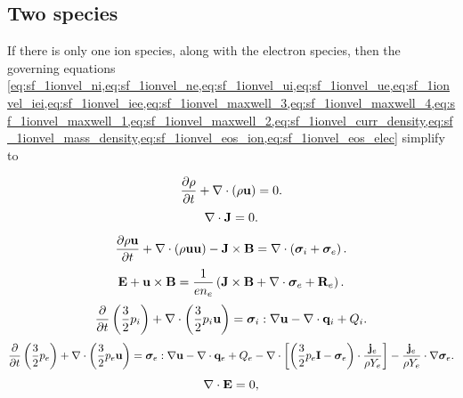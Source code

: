 \documentclass[a4paper,11pt]{report}
\begin{document}
\subsection{Two species}
If there is only one ion species, along with the electron species, then the governing equations \cref{eq:sf_1ionvel_ni,eq:sf_1ionvel_ne,eq:sf_1ionvel_ui,eq:sf_1ionvel_ue,eq:sf_1ionvel_iei,eq:sf_1ionvel_iee,eq:sf_1ionvel_maxwell_3,eq:sf_1ionvel_maxwell_4,eq:sf_1ionvel_maxwell_1,eq:sf_1ionvel_maxwell_2,eq:sf_1ionvel_curr_density,eq:sf_1ionvel_mass_density,eq:sf_1ionvel_eos_ion,eq:sf_1ionvel_eos_elec} simplify to

\begin{equation}
    \label{eq:sf_1ion_ni}
    \frac{\partial \rho}{\partial t} + \nabla \cdot \left( \rho \mathbf{u} \right) = 0.
\end{equation}
\begin{equation}
    \label{eq:sf_1ion_ne}
    \nabla \cdot \mathbf{J} = 0.
\end{equation}
\begin{equation}
    \label{eq:sf_1ion_ui}
    \frac{\partial \rho \mathbf{u}}{\partial t} + \nabla \cdot \left( \rho \mathbf{u} \mathbf{u} \right) - \mathbf{J} \times \mathbf{B} = \nabla \cdot \left( \bm \sigma_i + \bm \sigma_e \right).
\end{equation}
\begin{equation}
    \label{eq:sf_1ion_ue}
    \mathbf{E} + \mathbf{u} \times \mathbf{B} = \frac{1}{e n_e} \left( \mathbf{J} \times \mathbf{B} + \nabla \cdot \bm \sigma_e + \mathbf{R}_e \right) .
\end{equation}
\begin{equation}
    \label{eq:sf_1ion_iei}
    \frac{\partial}{\partial t} \left( \frac{3}{2} p_i \right) + \nabla \cdot \left( \frac{3}{2} p_i \mathbf{u} \right) = \bm \sigma_i : \nabla \mathbf{u} - \nabla \cdot \mathbf{q}_i + Q_i.
\end{equation}
\begin{equation}
    \label{eq:sf_1ion_iee}
    \frac{\partial}{\partial t} \left( \frac{3}{2} p_e \right) + \nabla \cdot \left( \frac{3}{2} p_e \mathbf{u} \right) = \bm \sigma_e : \nabla \mathbf{u} - \nabla \cdot \mathbf{q}_e + Q_e - \nabla \cdot \left[ \left( \frac{3}{2} p_e \mathbf{I} - \bm \sigma_e \right) \cdot \frac{\mathbf{j}_e}{\rho Y_e}  \right] - \frac{\mathbf{j}_e}{\rho Y_e} \cdot \nabla \bm \sigma_e.
\end{equation}
\begin{equation}
    \label{eq:sf_1ion_maxwell_3}
    \nabla \cdot \mathbf{E} = 0,
\end{equation}
\end{document}
